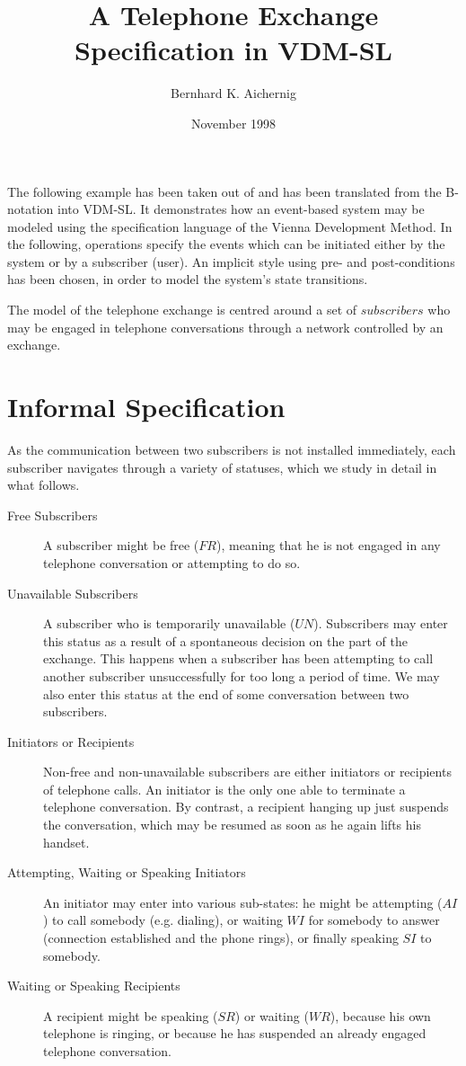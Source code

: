 \documentclass{article}
\title{A Telephone Exchange Specification in VDM-SL}
\author{Bernhard K. Aichernig}
\date{November 1998}
\begin{document}
\maketitle
The following example has been taken out of \cite{Abrial96} and has been 
translated from the B-notation into VDM-SL\cite{Fitzgerald&98, Jones90}. It
demonstrates how an event-based system may be modeled using the
specification language of the Vienna Development Method. In the following, 
operations specify the events which can be initiated either by  the system or 
by a subscriber (user). An implicit style using pre- and post-conditions has 
been chosen, in order to model the system's state transitions.

The model of the telephone
exchange is centred around a set of $subscribers$ who may be engaged in
telephone conversations through a network controlled by an exchange.
\section{Informal Specification}
As the communication between two subscribers is not installed immediately,
each subscriber navigates through a variety of statuses, which we study in
detail in what follows.
\begin{description}
\item[Free Subscribers] A subscriber might be free ($FR$),
meaning that he is not engaged in any telephone conversation or attempting to 
do so.
\item[Unavailable Subscribers] A subscriber who is temporarily unavailable
($UN$). Subscribers may enter this status as a result of a spontaneous 
decision on the part of the exchange. This happens when a subscriber has been
attempting to call another subscriber unsuccessfully for too long a period of
time. We may also enter this status at the end of some conversation between
two subscribers.
\item[Initiators or Recipients] Non-free and non-unavailable subscribers are
either initiators or recipients of telephone calls. An initiator is the only
one able to terminate a telephone conversation. By contrast, a recipient
hanging up just suspends the conversation, which may be resumed as soon as 
he again lifts his handset.
\item[Attempting, Waiting or Speaking Initiators]
An initiator may enter into various sub-states: he might be attempting ($AI$)
to call somebody (e.g. dialing), or waiting $WI$ for somebody to answer 
(connection established and the phone rings), or finally 
speaking $SI$ to somebody.
\item[Waiting or Speaking Recipients] A recipient might be speaking ($SR$) or
waiting ($WR$), because his own telephone is ringing, or because he has 
suspended an already engaged telephone conversation.   
\end{description}
\end{document}

